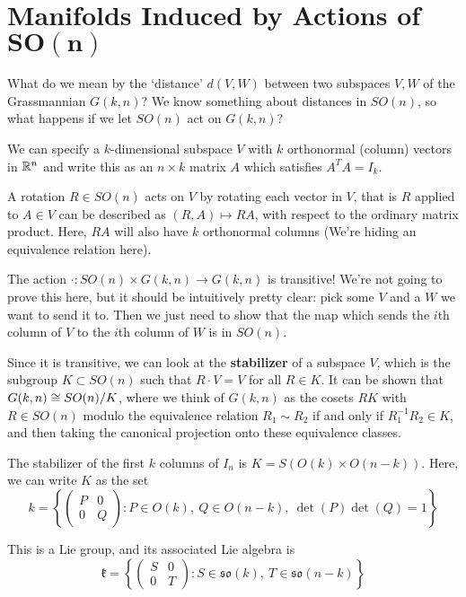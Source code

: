 
\section*{Manifolds Induced by Actions of $\boldsymbol{SO(n)}$}

What do we mean by the `distance' $d(V,W)$ between two subspaces $V,W$ of the Grassmannian $G(k,n)$?  We know something about distances in $SO(n)$, so what happens if we let $SO(n)$ act on $G(k,n)$?

We can specify a $k$-dimensional subspace $V$ with $k$ orthonormal (column) vectors in $\mathbb{R}^n$ and write this as an $n\times k$ matrix $A$ which satisfies $A^TA=I_k$.

A rotation $R\in SO(n)$ acts on $V$ by rotating each vector in $V$, that is $R$ applied to $A\in V$ can be described as $(R,A)\mapsto RA$, with respect to the ordinary matrix product.  Here, $RA$ will also have $k$ orthonormal columns (We're hiding an equivalence relation here).

The action $\cdot:SO(n)\times G(k,n)\rightarrow G(k,n)$ is transitive!  We're not going to prove this here, but it should be intuitively pretty clear: pick some $V$ and a $W$ we want to send it to.  Then we just need to show that the map which sends the $i$th column of $V$ to the $i$th column of $W$ is in $SO(n)$.

Since it is transitive, we can look at the \textbf{stabilizer} of a subspace $V$, which is the subgroup $K\subset SO(n)$ such that $R\cdot V=V$ for all $R\in K$.  It can be shown that $G(k,n)\cong SO(n)/K$, where we think of $G(k,n)$ as the cosets $RK$ with $R\in SO(n)$ modulo the equivalence relation $R_1\sim R_2$ if and only if $R_1^{-1}R_2\in K$, and then taking the canonical projection onto these equivalence classes.

The stabilizer of the first $k$ columns of $I_n$ is $K=S(O(k)\times O(n-k))$.  Here, we can write $K$ as the set $$k=\left\{  \begin{pmatrix} P&0\\0&Q\end{pmatrix} : P\in O(k),\ Q\in O(n-k),\ \det(P)\det(Q)=1   \right\}$$

This is a Lie group, and its associated Lie algebra is 
$$\mathfrak{k}=\left\{  \begin{pmatrix} S&0\\0&T\end{pmatrix} : S\in\mathfrak{so}(k),\ T\in\mathfrak{so}(n-k)   \right\}$$

